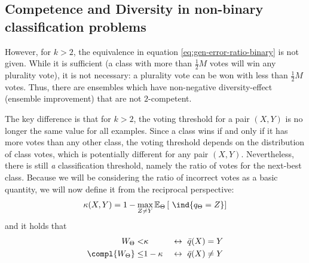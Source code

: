 \documentclass[../main.tex]{subfiles}
\begin{document}
\subsection{Competence and Diversity in non-binary classification problems}
However, for $k>2$, the equivalence in equation \ref{eq:gen-error-ratio-binary} is not given. While it is sufficient (a class with more than $\frac{1}{2}M$ votes will win any plurality vote), it is not necessary: a plurality vote can be won with less than $\frac{1}{2}M$ votes. Thus, there are ensembles which have non-negative diversity-effect (ensemble improvement) that are not $2$-competent. %

The key difference is that for $k>2$, the voting threshold for a pair $(X,Y)$ is no longer the same value for all examples. Since a class wins if and only if it has more votes than any other class, the voting threshold depends on the distribution of class votes, which is potentially different for any pair $(X,Y)$. Nevertheless, there is still \textit{a} classification threshold, namely the ratio of votes for the next-best class. Because we will be considering the ratio of incorrect votes as a basic quantity, we will now define it from the reciprocal perspective:
$$
\kappa (X,Y) = 1 - \max_{Z \not= Y} \mathbb{E}_{\Theta}\left[ ~\ind{q_{\Theta} = Z} \right] 
$$
and it holds that
$$
\begin{align}
W_{\Theta} <& \kappa  & ~\leftrightarrow~ \bar{q}(X) = Y \\ 
\compl{W_{\Theta}} \leq& 1-\kappa  & ~\leftrightarrow~ \bar{q}(X) \not= Y
\end{align}
$$
\end{document}
